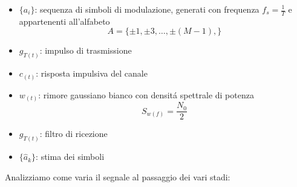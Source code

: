             \begin{itemize}
                \item {$\{a_i\}$: sequenza di simboli di modulazione, generati con frequenza $f_s=\frac{1}{T}$ e appartenenti all'alfabeto
                \[
                    A = \{\pm 1,\pm 3, \dots, \pm (M-1),\}  
                \]}
                \item {$g_{T(t)}$: impulso di trasmissione}
                \item {$c_{(t)}$: risposta impulsiva del canale}
                \item {$w_{(t)}$: rimore gaussiano bianco con densitá spettrale di potenza\[
                    S_{w(f)} = \frac{N_0}{2}  
                \]}
                \item {$g_{T(t)}$: filtro di ricezione}
                \item {$\{\hat{a}_k\}$: stima dei simboli}
            \end{itemize}
            Analizziamo come varia il segnale al passaggio dei vari stadi:
